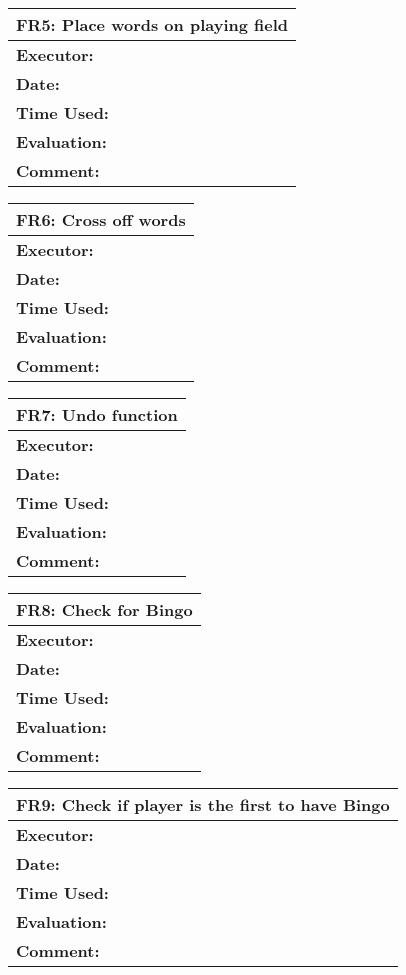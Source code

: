 \begin{tabular}{|m{}||m{}|}
\hline
\multicolumn{2}{|l|}{FR5: Place words on playing field} \\ \hline
\textbf{Executor:} & \\ \hline
\textbf{Date:} & \\ \hline
\textbf{Time Used:} & \\ \hline
\textbf{Evaluation:} & \\ \hline
\textbf{Comment:} & \\ \hline
\end{tabular}

\begin{tabular}{|m{}||m{}|}
\hline
\multicolumn{2}{|l|}{FR6: Cross off words} \\ \hline
\textbf{Executor:} & \\ \hline
\textbf{Date:} & \\ \hline
\textbf{Time Used:} & \\ \hline
\textbf{Evaluation:} & \\ \hline
\textbf{Comment:} & \\ \hline
\end{tabular}

\begin{tabular}{|m{}||m{}|}
\hline
\multicolumn{2}{|l|}{FR7: Undo function} \\ \hline
\textbf{Executor:} & \\ \hline
\textbf{Date:} & \\ \hline
\textbf{Time Used:} & \\ \hline
\textbf{Evaluation:} & \\ \hline
\textbf{Comment:} & \\ \hline
\end{tabular}

\begin{tabular}{|m{}||m{}|}
\hline
\multicolumn{2}{|l|}{FR8: Check for Bingo} \\ \hline
\textbf{Executor:} & \\ \hline
\textbf{Date:} & \\ \hline
\textbf{Time Used:} & \\ \hline
\textbf{Evaluation:} & \\ \hline
\textbf{Comment:} & \\ \hline
\end{tabular}

\begin{tabular}{|m{}||m{}|}
\hline
\multicolumn{2}{|l|}{FR9: Check if player is the first to have Bingo} \\ \hline
\textbf{Executor:} & \\ \hline
\textbf{Date:} & \\ \hline
\textbf{Time Used:} & \\ \hline
\textbf{Evaluation:} & \\ \hline
\textbf{Comment:} & \\ \hline
\end{tabular}

